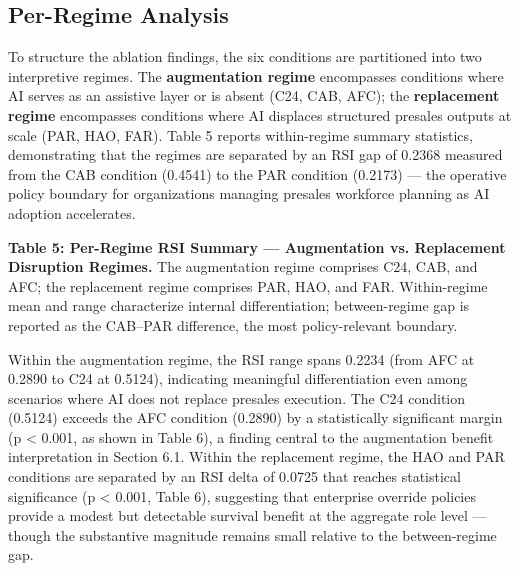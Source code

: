 \documentclass[10pt, conference]{IEEEtran}
\begin{document}
\subsection{Per-Regime Analysis}

\label{sec:per\_regime\_analysis}

To structure the ablation findings, the six conditions are partitioned into two interpretive regimes. The \textbf{augmentation regime} encompasses conditions where AI serves as an assistive layer or is absent (C24, CAB, AFC); the \textbf{replacement regime} encompasses conditions where AI displaces structured presales outputs at scale (PAR, HAO, FAR). Table 5 reports within-regime summary statistics, demonstrating that the regimes are separated by an RSI gap of 0.2368 measured from the CAB condition (0.4541) to the PAR condition (0.2173) --- the operative policy boundary for organizations managing presales workforce planning as AI adoption accelerates.

\textbf{Table 5: Per-Regime RSI Summary --- Augmentation vs. Replacement Disruption Regimes.} The augmentation regime comprises C24, CAB, and AFC; the replacement regime comprises PAR, HAO, and FAR. Within-regime mean and range characterize internal differentiation; between-regime gap is reported as the CAB--PAR difference, the most policy-relevant boundary.

\begin{table}[ht]
\centering
\caption{Comparison of Regime across Conditions, Mean RSI, RSI Range, Mean Seed Std}
\label{tab:5}
\end{table}

Within the augmentation regime, the RSI range spans 0.2234 (from AFC at 0.2890 to C24 at 0.5124), indicating meaningful differentiation even among scenarios where AI does not replace presales execution. The C24 condition (0.5124) exceeds the AFC condition (0.2890) by a statistically significant margin (p < 0.001, as shown in Table 6), a finding central to the augmentation benefit interpretation in Section 6.1. Within the replacement regime, the HAO and PAR conditions are separated by an RSI delta of 0.0725 that reaches statistical significance (p < 0.001, Table 6), suggesting that enterprise override policies provide a modest but detectable survival benefit at the aggregate role level --- though the substantive magnitude remains small relative to the between-regime gap.
\end{document}

